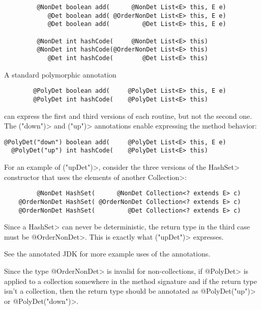 \begin{Verbatim}
         @NonDet boolean add(      @NonDet List<E> this, E e)
            @Det boolean add( @OrderNonDet List<E> this, E e)
            @Det boolean add(         @Det List<E> this, E e)

         @NonDet int hashCode(     @NonDet List<E> this)
         @NonDet int hashCode(@OrderNonDet List<E> this)
            @Det int hashCode(        @Det List<E> this)
\end{Verbatim}

A standard polymorphic annotation

\begin{Verbatim}
        @PolyDet boolean add(     @PolyDet List<E> this, E e)
        @PolyDet int hashCode(    @PolyDet List<E> this)
\end{Verbatim}

\noindent
can express the first and third versions of each routine, but not the
second one.  The \<("down")> and
\<("up")> annotations enable
expressing the method behavior:

\begin{Verbatim}
@PolyDet("down") boolean add(     @PolyDet List<E> this, E e)
  @PolyDet("up") int hashCode(    @PolyDet List<E> this)
\end{Verbatim}

For an example of \<("upDet")>,
consider the three versions of the \<HashSet> constructor that uses the elements
of another \<Collection>:

\begin{Verbatim}
         @NonDet HashSet(      @NonDet Collection<? extends E> c)
    @OrderNonDet HashSet( @OrderNonDet Collection<? extends E> c)
    @OrderNonDet HashSet(         @Det Collection<? extends E> c)
\end{Verbatim}

Since a \<HashSet> can never be deterministic, the return type in the third case
must be \<@OrderNonDet>. This is exactly what
\<("upDet")> expresses.

See the annotated JDK for more example uses of the annotations.

Since the type \<@OrderNonDet> is invalid for non-collections,
if \<@PolyDet> is applied to a collection somewhere in the method signature
and if the return type isn't a collection, then the return type should be
annotated as \<@PolyDet("up")> or \<@PolyDet("down")>.

